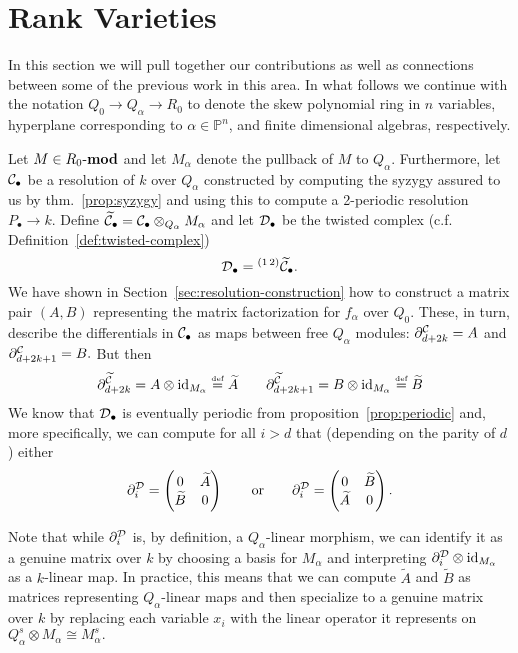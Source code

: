 \documentclass [11pt, proquest] {uwthesis}[2020/02/24]
\begin{document}
\section{Rank Varieties}
    In this section we will pull together our contributions as well as connections between some of the previous work in this area. In what follows we continue with the notation $Q_0\to Q_\alpha\to R_0$ to denote the skew polynomial ring in $n$ variables, hyperplane corresponding to $\alpha\in\mathbb P^n$, and finite dimensional algebras, respectively.
    
    
    Let $M\in R_0\text{-}\mathbf{mod}$ and let $M_\alpha$ denote the pullback of $M$ to $Q_\alpha.$ Furthermore, let $\mathcal{C}_\bullet$ be a resolution of $k$ over $Q_\alpha$ constructed by computing the syzygy assured to us by thm.~\ref{prop:syzygy} and using this to compute a 2-periodic resolution $P_\bullet\to k.$ Define $\widetilde{\mathcal{C}}_\bullet=\mathcal{C}_\bullet\otimes_{Q_\alpha} M_\alpha$ and let $\mathcal{D}_\bullet$ be the twisted complex (c.f. Definition~\ref{def:twisted-complex})
    \[\mathcal{D}_\bullet={^{(1\,2)}\widetilde{\mathcal{C}}_\bullet.}\]
    We have shown in Section~\ref{sec:resolution-construction} how to construct a matrix pair $(A,B)$ representing the matrix factorization for $f_\alpha$ over $Q_0$. These, in turn, describe the differentials in $\mathcal{C}_\bullet$ as maps between free $Q_\alpha$ modules: $\partial^{\mathcal{C}}_{d+2k}=A$ and $\partial^{\mathcal{C}}_{d+2k+1}=B.$ But then
    \[\partial^{\widetilde{\mathcal{C}}}_{d+2k}=A\otimes \operatorname{id}_{M_\alpha}\stackrel{\text{\tiny def}}{=}\widetilde{A}\qquad \partial^{\widetilde{\mathcal{C}}}_{d+2k+1}=B\otimes \operatorname{id}_{M_\alpha}\stackrel{\text{\tiny def}}{=}\widetilde{B}\]
    We know that $\mathcal{D}_\bullet$ is eventually periodic from proposition~\ref{prop:periodic} and, more specifically, we can compute for all $i>d$ that (depending on the parity of $d$) either
    \[\partial^{\mathcal{D}}_i=\begin{pmatrix}0&\widetilde{A}\\\widetilde{B}&0\end{pmatrix}\qquad\text{or}\qquad\partial^{\mathcal{D}}_i=\begin{pmatrix}0&\widetilde{B}\\\widetilde{A}&0\end{pmatrix}.\]
    
    Note that while $\partial^{\mathcal{D}}_i$ is, by definition, a $Q_\alpha$-linear morphism, we can identify it as a genuine matrix over $k$ by choosing a basis for $M_\alpha$ and interpreting $\partial_i^{\mathcal{D}}\otimes\operatorname{id}_{M_\alpha}$ as a $k$-linear map. In practice, this means that we can compute $\tilde A$ and $\tilde B$ as matrices representing $Q_\alpha$-linear maps and then specialize to a genuine matrix over $k$ by replacing each variable $x_i$ with the linear operator it represents on $Q_\alpha^s\otimes M_\alpha\cong M_\alpha^s.$
    
\end{document}
